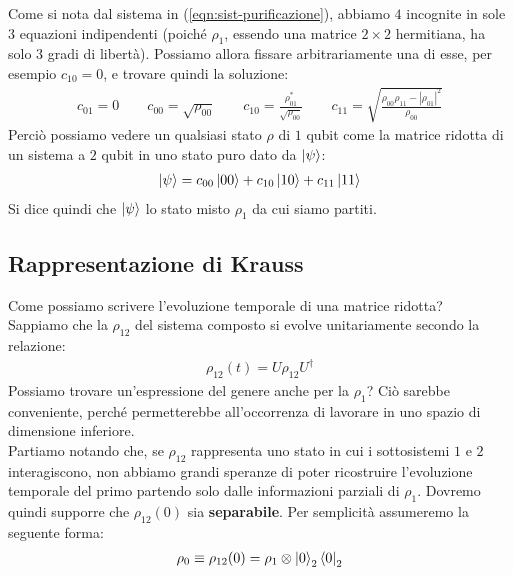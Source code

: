 \documentclass[../../InformazioneQuantistica.tex]{subfiles}
\begin{document}
Come si nota dal sistema in (\ref{eqn:sist-purificazione}), abbiamo $4$ incognite in sole $3$ equazioni indipendenti (poiché $\rho_1$, essendo una matrice $2\times 2$ hermitiana, ha solo $3$ gradi di libertà). Possiamo allora fissare arbitrariamente una di esse, per esempio $c_{10}=0$, e trovare quindi la soluzione:
\begin{align*}
c_{01} = 0 \qquad c_{00} = \sqrt{\rho_{00}} \qquad c_{10}=\frac{\rho_{01}^*}{\sqrt{\rho_{00}}} \qquad c_{11} = \sqrt{\frac{\rho_{00}\rho_{11} - |\rho_{01}|^2}{\rho_{00}}}
\end{align*}
Perciò possiamo vedere un qualsiasi stato $\rho$ di $1$ qubit come la matrice ridotta di un sistema a $2$ qubit in uno stato puro dato da $\Ket{\psi}$:
\begin{align*}
\Ket{\psi} = c_{00}\Ket{00} + c_{10}\Ket{10} + c_{11}\Ket{11}
\end{align*}
Si dice quindi che $\Ket{\psi}$  lo stato misto $\rho_1$ da cui siamo partiti.



\subsection{Rappresentazione di Krauss}
Come possiamo scrivere  l'evoluzione temporale di una matrice ridotta?\\
Sappiamo che la $\rho_{12}$ del sistema composto si evolve unitariamente secondo la relazione:
\begin{align*}
\rho_{12}(t) = U \rho_{12}U^\dag
\end{align*}
Possiamo trovare un'espressione del genere anche per la $\rho_1$? Ciò sarebbe conveniente, perché permetterebbe all'occorrenza di lavorare in uno spazio di dimensione inferiore.\\

Partiamo notando che, se $\rho_{12}$ rappresenta uno stato in cui i sottosistemi $1$ e $2$ interagiscono, non abbiamo grandi speranze di poter ricostruire l'evoluzione temporale del primo partendo solo dalle informazioni parziali di $\rho_1$. Dovremo quindi supporre che $\rho_{12}(0)$ sia \textbf{separabile}. Per semplicità assumeremo la seguente forma:
\begin{align}
\rho_0 \equiv \rho_{12}(0)=\rho_1 \otimes \Ket{0}_2 \Bra{0}_2
\label{eqn:rho-0}
\end{align}
\end{document}
